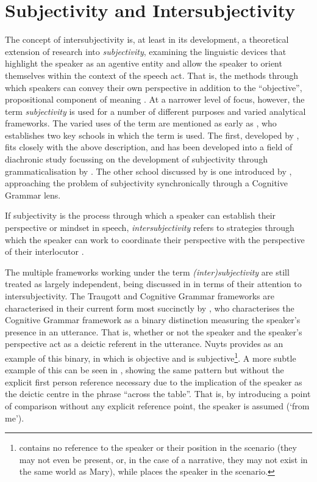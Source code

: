 \section{Subjectivity and Intersubjectivity}
The concept of intersubjectivity is, at least in its development, a theoretical extension of research into \textit{subjectivity}, examining the linguistic devices that highlight the speaker as an agentive entity and allow the speaker to orient themselves within the context of the speech act. That is, the methods through which speakers can convey their own perspective in addition to the ``objective'', propositional component of meaning \cite{Finegan1995}. At a narrower level of focus, however, the term \textit{subjectivity} is used for a number of different purposes and varied analytical frameworks. The varied uses of the term are mentioned as early as , who establishes two key schools in which the term is used. The first, developed by , fits closely with the above description, and has been developed into a field of diachronic study focussing on the development of subjectivity through grammaticalisation by . The other school discussed by  is one introduced by , approaching the problem of subjectivity synchronically through a Cognitive Grammar lens.
    
If subjectivity is the process through which a speaker can establish their perspective or mindset in speech, \textit{intersubjectivity} refers to strategies through which the speaker can work to coordinate their perspective with the perspective of their interlocutor \cite{Brems2014}.

The multiple frameworks working under the term \textit{(inter)subjectivity} are still treated as largely independent, being discussed in  in terms of their attention to intersubjectivity. The Traugott and Cognitive Grammar frameworks are characterised in their current form most succinctly by , who characterises the Cognitive Grammar framework as a binary distinction measuring the speaker's presence in an utterance. That is, whether or not the speaker and the speaker's perspective act as a deictic referent in the utterance. Nuyts provides  as an example of this binary, in which  is objective and  is subjective\footnote{ contains no reference to the speaker or their position in the scenario (they may not even be present, or, in the case of a narrative, they may not exist in the same world as Mary), while  places the speaker in the scenario.}. A more subtle example of this can be seen in , showing the same pattern but without the explicit first person reference necessary due to the implication of the speaker as the deictic centre in the phrase ``across the table''. That is, by introducing a point of comparison without any explicit reference point, the speaker is assumed (`from me').

